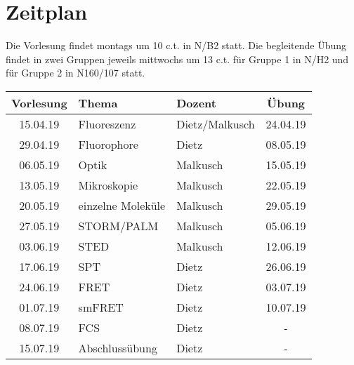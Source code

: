 \section{Zeitplan}
Die Vorlesung findet montags um 10 c.t. in N/B2 statt. Die begleitende Übung findet in zwei Gruppen jeweils mittwochs um 13 c.t. für Gruppe 1 in N/H2 und für Gruppe 2 in N160/107 statt.

\vspace{0.5cm}

\begin{center}
\begin{tabular}{cllc}
Vorlesung & Thema & Dozent & Übung\\
\hline
15.04.19 & Fluoreszenz & Dietz/Malkusch & 24.04.19\\
29.04.19 & Fluorophore & Dietz & 08.05.19\\
06.05.19 & Optik & Malkusch & 15.05.19\\
13.05.19 & Mikroskopie & Malkusch & 22.05.19\\
20.05.19 & einzelne Moleküle & Malkusch & 29.05.19\\
27.05.19 & STORM/PALM & Malkusch & 05.06.19\\
03.06.19 & STED & Malkusch & 12.06.19\\
17.06.19 & SPT & Dietz & 26.06.19\\
24.06.19 & FRET & Dietz & 03.07.19\\
01.07.19 & smFRET & Dietz & 10.07.19\\
08.07.19 & FCS & Dietz & -\\
15.07.19 & Abschlussübung & Dietz & -
\end{tabular}
\end{center}